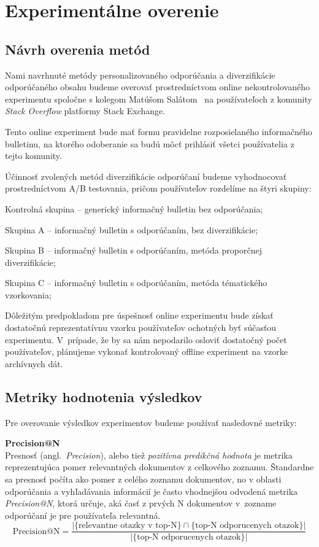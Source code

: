 \newpage
\chapter{Experimentálne overenie}


\section{Návrh overenia metód}

Nami navrhnuté metódy personalizovaného odporúčania a diverzifikácie odporúčaného obsahu budeme overovať prostredníctvom
online nekontrolovaného experimentu spoločne s kolegom Matúšom Salátom~\cite{Salat2018} na používateľoch z komunity \textit{Stack Overflow} platformy Stack Exchange.

Tento online experiment bude mať formu pravidelne rozposielaného informačného bulletinu, na ktorého odoberanie sa budú
môcť prihlásiť všetci používatelia z tejto komunity.

Účinnosť zvolených metód diverzifikácie odporúčaní budeme vyhodnocovať prostredníctvom A/B testovania, pričom používateľov
rozdelíme na štyri skupiny:
\begin{my_enumerate}
    \item{Kontrolná skupina -- generický informačný bulletin bez odporúčania;}
    \item{Skupina A -- informačný bulletin s odporúčaním, bez diverzifikácie;}
    \item{Skupina B -- informačný bulletin s odporúčaním, metóda proporčnej diverzifikácie;}
    \item{Skupina C -- informačný bulletin s odporúčaním, metóda tématického vzorkovania;}
\end{my_enumerate}

Dôležitým predpokladom pre úspešnosť online experimentu bude získať dostatočnú reprezentatívnu vzorku používateľov
ochotných byť súčasťou experimentu. V~prípade, že by sa nám nepodarilo osloviť dostatočný počet používateľov, plánujeme
vykonať kontrolovaný offline experiment na vzorke archívnych dát.


\section{Metriky hodnotenia výsledkov}

Pre overovanie výsledkov experimentov budeme používať nasledovné metriky:

\textbf{Precision@N}\\
Presnosť (angl.~\emph{Precision}), alebo tiež \textit{pozitívna predikčná hodnota} je metrika reprezentujúca pomer relevantných
dokumentov z celkového zoznamu. Štandardne sa presnosť počíta ako pomer z celého zoznamu dokumentov, no v oblasti
odporúčania a vyhľadávania informácií je často vhodnejšou odvodená metrika \textit{Precision@N}, ktorá určuje, aká časť
z prvých N dokumentov v~zozname odporúčaní je pre používateľa relevantná.
$$\mbox{Precision@N}=\frac{|\{\mbox{relevantne otazky v top-N}\}\cap\{\mbox{top-N odporucenych otazok}\}|}{|\{\mbox{top-N odporucenych otazok}\}|}$$

